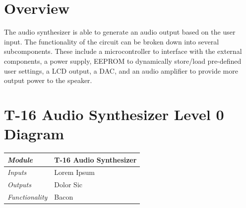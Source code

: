 \documentclass{article}
\begin{document}
\newenvironment{frcseries}{\fontfamily{frc}\selectfont}{}
\newcommand{\textfrc}[1]{{\frcseries#1}}
\newcommand{\mathfrc}[1]{\text{\textfrc{#1}}}

\section{Overview}
The audio synthesizer is able to generate an audio output based on the user input.  The functionality of the circuit can be broken down into several subcomponents.  These include a microcontroller to interface with the external components, a power supply, EEPROM to dynamically store/load pre-defined user settings, a LCD output, a DAC, and an audio amplifier to provide more output power to the speaker.


\section{T-16 Audio Synthesizer Level 0 Diagram}

\begin{tabular}{|p{1in}|p{5in}|}
\hline
\emph{Module} & T-16 Audio Synthesizer \\
\hline
\emph{Inputs}& Lorem Ipsum\\
\hline
\emph{Outputs}& Dolor Sic \\ 
\hline
\emph{Functionality}& Bacon\\
\hline
\end{tabular}
\end{document}
